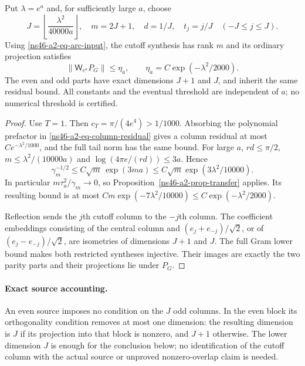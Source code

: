\begin{corollary}
\label{ns46-a2-cor-large-block}
Put $\lambda=e^a$ and, for sufficiently large $a$, choose
\[
 J=\left\lfloor\frac{\lambda^2}{40000a}\right\rfloor,
 \quad m=2J+1,\quad d=1/J,\quad t_j=j/J\quad(-J\le j\le J).
\]
Using \eqref{ns46-a2-eq-arc-input}, the cutoff synthesis has
rank $m$ and its ordinary projection satisfies
\begin{equation}\label{ns46-a2-eq-large-residual}
 \|\mathsf W_{e^a}P_G\|\le\eta_a,
 \qquad \eta_a=C\exp(-\lambda^2/2000).
\end{equation}
The even and odd parts have exact dimensions $J+1$ and $J$,
and inherit the same residual bound. All constants and the eventual
threshold are independent of $a$; no numerical threshold is certified.
\end{corollary}
\begin{proof}
Use $T=1$. Then $c_T=\pi/(4e^4)>1/1000$.
Absorbing the polynomial prefactor in
\eqref{ns46-a2-eq-column-residual} gives a column residual at most
$Ce^{-\lambda^2/1000}$, and the full tail norm has the same bound.
For large $a$, $rd\le\pi/2$, $m\le\lambda^2/(10000a)$ and
$\log(4\pi e/(rd))\le3a$. Hence
\[
 \gamma_m^{-1/2}\le C\sqrt m\,
       \exp(3ma)\le C\sqrt m\exp(3\lambda^2/10000).
\]
In particular $m\tau_a^2/\gamma_m\to0$, so
Proposition~\ref{ns46-a2-prop-transfer} applies. Its resulting
bound is at most
$Cm\exp(-7\lambda^2/10000)\le C\exp(-\lambda^2/2000)$.

Reflection sends the $j$th cutoff column to the $-j$th column.
The coefficient embeddings consisting of the central column and
$(e_j+e_{-j})/\sqrt2$, or of $(e_j-e_{-j})/\sqrt2$, are
isometries of dimensions $J+1$ and $J$. The full Gram lower bound
makes both restricted syntheses injective. Their images are exactly
the two parity parts and their projections lie under $P_G$.
\end{proof}

\paragraph{Exact source accounting.}
An even source imposes no condition on the $J$ odd columns. In the
even block its orthogonality condition removes at most one dimension:
the resulting dimension is $J$ if its projection into that block is
nonzero, and $J+1$ otherwise. The lower dimension $J$ is enough for
the conclusion below; no identification of the cutoff column with
the actual source or unproved nonzero-overlap claim is needed.

